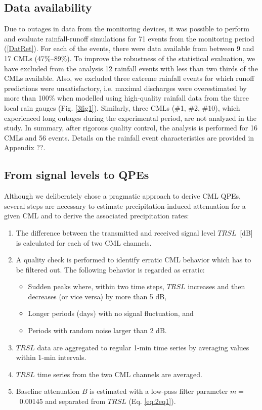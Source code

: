 \documentclass{ctuthesis}\usepackage[]{graphicx}\usepackage[]{color}
\begin{document}
\subsection{Data availability} \label{paperIdatAval}

Due to outages in data from the monitoring devices, it was possible to perform and evaluate rainfall-runoff simulations for 71 events from the monitoring period (\ref{DatRet}). For each of the events, there were data available from between 9 and 17 CMLs (47\%--89\%). To improve the robustness of the statistical evaluation, we have excluded from the analysis 12 rainfall events with less than two thirds of the CMLs available. Also, we excluded three extreme rainfall events for which runoff predictions were unsatisfactory, i.e. maximal discharges were overestimated by more than 100\% when modelled using high-quality rainfall data from the three local rain gauges (Fig. \ref{3fig1}). Similarly, three CMLs (\#1, \#2, \#10), which experienced long outages during the experimental period, are not analyzed in the study. In summary, after rigorous quality control, the analysis is performed for 16 CMLs and 56 events. Details on the rainfall event characteristics are provided in Appendix ??.


\subsection{From signal levels to QPEs} \label{DerCML}

Although we deliberately chose a pragmatic approach to derive CML QPEs, several steps are necessary to estimate precipitation-induced attenuation for a given CML and to derive the associated precipitation rates:
        \begin{enumerate}
                \item The difference between the transmitted and received signal level $TRSL$~[dB] is calculated for each of two CML channels. 
                \item A quality check is performed to identify erratic CML behavior which has to be filtered out. The following behavior is regarded as erratic:
                \begin{itemize}
                        \item Sudden peaks where, within two time steps, $TRSL$ increases and then decreases (or vice versa) by more than 5 dB,
                        \item Longer periods (days) with no signal fluctuation, and
                        \item Periods with random noise larger than 2 dB. 
                \end{itemize}
                \item $TRSL$ data are aggregated to regular 1-min time series by averaging values within 1-min intervals. 
                \item $TRSL$ time series from the two CML channels are averaged. 
                \item Baseline attenuation $B$ is estimated with a low-pass filter parameter $m =$~0.00145 \citep{feniciaMicrowaveLinksRainfall2012} and separated from $TRSL$ (Eq. \ref{eq:2eq1}).
        \end{enumerate}
\end{document}

